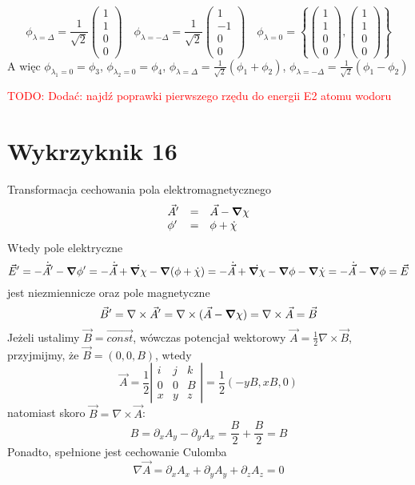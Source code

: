 \documentclass[a4paper,12pt]{article}
\newcommand\myworries[1]{\textcolor{red}{#1}} %
\begin{document}
\begin{equation*}
  \phi_{\lambda=\Delta} = \frac{1}{\sqrt{2}}\begin{pmatrix} 1 \\ 1 \\ 0 \\ 0 \end{pmatrix}\quad
  \phi_{\lambda = -\Delta} = \frac{1}{\sqrt{2}}\begin{pmatrix} 1 \\ -1 \\ 0 \\ 0 \end{pmatrix}\quad
  \phi_{\lambda = 0} = \left\{\begin{pmatrix}1 \\ 1 \\ 0 \\
    0\end{pmatrix},\begin{pmatrix}1 \\ 1 \\ 0 \\ 0\end{pmatrix} \right\}
\end{equation*}
A więc $\phi_{\lambda_1=0} = \phi_3$, $\phi_{\lambda_2=0} = \phi_4$,
$\phi_{\lambda=\Delta} = \frac{1}{\sqrt{2}}\left( \phi_1 + \phi_2 \right)$,
$\phi_{\lambda=-\Delta} = \frac{1}{\sqrt{2}}\left( \phi_1 - \phi_2 \right)$

\myworries{TODO: Dodać: najdź poprawki pierwszego rzędu do energii E2 atomu wodoru}
\section{Wykrzyknik 16}
	Transformacja cechowania pola elektromagnetycznego
	$$
	\begin{array}{lll}
		\vec{A}' &=& \vec{A}-\grad{\chi} \\
		\phi' &=& \phi+\dot{\chi}
	\end{array}
	$$
	Wtedy pole elektryczne
	$$
		\vec{E}' = -\dot{\vec{A}}'-\grad{\phi}' = -\dot{\vec{A}}+\dot{\grad{\chi}} - \grad{(\phi+\dot{\chi})} = -\dot{\vec{A}}+\dot{\grad{\chi}} - \grad{\phi} - \grad{\dot{\chi}} = -\dot{\vec{A}} - \grad{\phi} = \vec{E}
	$$
	jest niezmiennicze oraz pole magnetyczne
	$$
		\vec{B}' = \nabla\times\vec{A}' = \nabla\times(\vec{A}-\grad{\chi}) = \nabla\times\vec{A} = \vec{B}
	$$
	Jeżeli ustalimy $\vec{B}=\vec{const}$, wówczas potencjał wektorowy $\vec{A} = \frac{1}{2} \nabla \times \vec{B}$, przyjmijmy, że $\vec{B} = (0,0,B)$, wtedy
	$$
		\vec{A} = \frac{1}{2}\left|
			\begin{array}{ccc}
				i & j & k \\
				0 & 0 & B \\
				x & y & z 
			\end{array}\right| = \frac{1}{2}(-yB,xB,0)
	$$
	natomiast skoro $\vec{B} = \nabla\times\vec{A}$:
	$$
		B = \partial_x A_y - \partial_y A_x =\frac{B}{2}+\frac{B}{2} = B
	$$
	Ponadto, spełnione jest cechowanie Culomba
	$$
		\nabla\vec{A} =\partial_x A_x + \partial_y A_y + \partial_z A_z = 0
	$$
\end{document}
